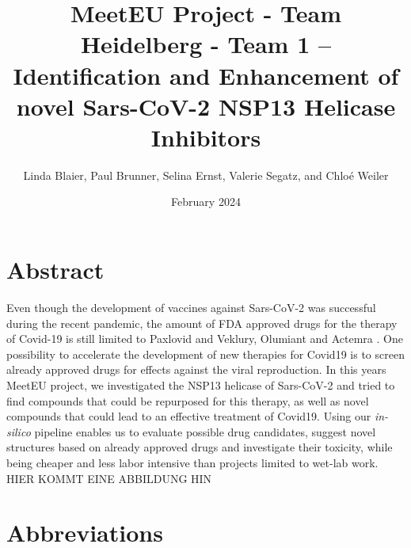 \documentclass[11pt, letterpaper, titlepage]{article}
\title{MeetEU Project - Team Heidelberg - Team 1 -- \\ Identification and Enhancement of novel Sars-CoV-2 NSP13 Helicase Inhibitors}
\author{Linda Blaier, Paul Brunner, Selina Ernst, Valerie Segatz, and Chlo\'{e} Weiler}
\date{February 2024}
\begin{document}
\maketitle

\ihead{\headmark}
\cfoot{\pagemark}   %

\section{Abstract}
Even though the development of vaccines against Sars-CoV-2 was successful during the recent pandemic, the amount of FDA approved drugs for the therapy of Covid-19 is still limited to Paxlovid and Veklury, Olumiant and Actemra \cite{FDA_COVID}. One possibility to accelerate the development of new therapies for Covid19 is to screen already approved drugs for effects against the viral reproduction. In this years MeetEU project, we investigated the NSP13 helicase of Sars-CoV-2 and tried to find compounds that could be repurposed for this therapy, as well as novel compounds that could lead to an effective treatment of Covid19. Using our \textit{in-silico} pipeline enables us to evaluate possible drug candidates, suggest novel structures based on already approved drugs and investigate their toxicity, while being cheaper and less labor intensive than projects limited to wet-lab work. 
HIER KOMMT EINE ABBILDUNG HIN

\newpage
{\setlength{\parskip}{0.2cm}
\section*{Abbreviations}
    \begin{acronym}[LC-MS/MS23]
       
        
        
        
        
    \end{acronym}
}
\newpage
\end{document}
